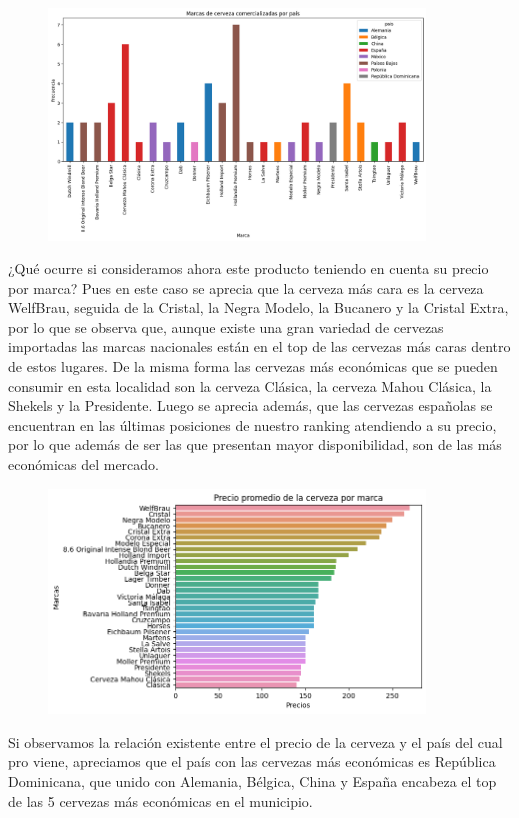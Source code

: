 \documentclass[a4paper,12pt]{article}
\begin{document}
		\begin{figure}[h]
			\centering
			\includegraphics[width=10cm]{country beer.png}
			\label{fig:Variedades de cerveza por país}
		\end{figure}
		¿Qué ocurre si consideramos ahora este producto teniendo en cuenta su precio por marca? Pues en este caso se aprecia que la cerveza más cara es la cerveza WelfBrau, seguida de la Cristal, la Negra Modelo, la Bucanero y la Cristal Extra, por lo que se observa que, aunque existe una gran variedad de cervezas importadas las marcas nacionales están en el top de las cervezas más caras dentro de estos lugares. De la misma forma las cervezas más económicas que se pueden consumir en esta localidad son la cerveza Clásica, la cerveza Mahou Clásica, la Shekels y la Presidente. Luego se aprecia además, que las cervezas españolas se encuentran en las últimas posiciones de nuestro ranking atendiendo a su precio, por lo que además de ser las que presentan mayor disponibilidad, son de las más económicas del mercado.
		
		\begin{figure}[h]
			\centering
			\includegraphics[width=10cm]{price beer.png}
			\label{fig:precio promedio por marca de cerveza}
		\end{figure}
		
		Si observamos la relación existente entre el precio de la cerveza y el país del cual pro viene, apreciamos que el país con las cervezas más económicas es República Dominicana, que unido con Alemania, Bélgica, China y España encabeza el top de las 5 cervezas más económicas en el municipio.
		
\end{document}
